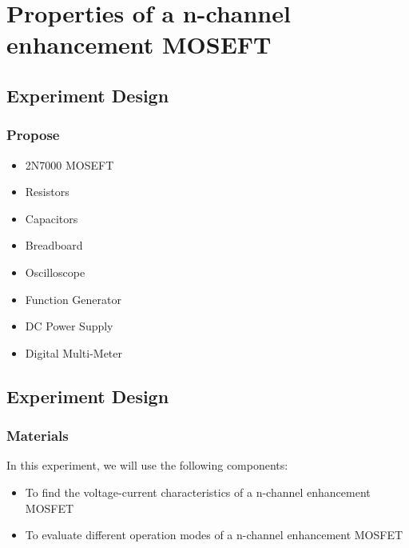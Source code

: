 \section{Properties of a n-channel enhancement MOSEFT}

\subsection{Experiment Design}
    \subsubsection{Propose}
    \begin{itemize}
        \item 2N7000 MOSEFT
        \item Resistors
        \item Capacitors
        \item Breadboard
        \item Oscilloscope
        \item Function Generator
        \item DC Power Supply
        \item Digital Multi-Meter
    \end{itemize}

\subsection{Experiment Design}
    \subsubsection{Materials}
        In this experiment, we will use the following components:
        \begin{itemize}
            \item To find the voltage-current characteristics of a n-channel enhancement MOSFET
            \item To evaluate different operation modes of a n-channel enhancement MOSFET
        \end{itemize}

